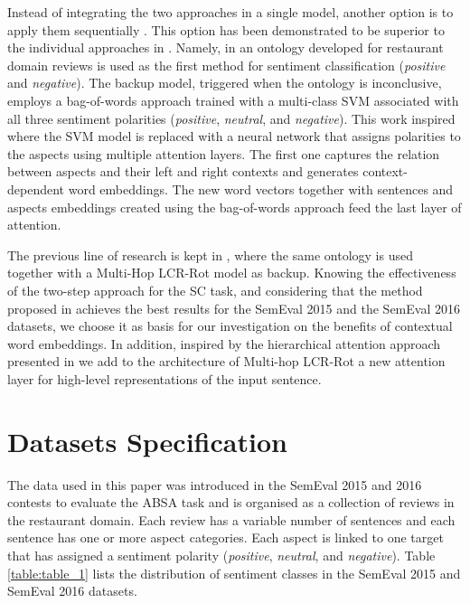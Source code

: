 \documentclass[hidelinks]{llncs}
\begin{document}
Instead of integrating the two approaches in a single model, another option is to apply them sequentially \cite{chikersal2015sentu}. This option has been demonstrated to be superior to the individual approaches in \cite{schouten2018ontology}. Namely, in \cite{schouten2018ontology} an ontology developed for restaurant domain reviews is used as the first method for sentiment classification (\textit{positive} and \textit{negative}). The backup model, triggered when the ontology is inconclusive, employs a bag-of-words approach trained with a multi-class SVM associated with all three sentiment polarities (\textit{positive}, \textit{neutral}, and \textit{negative}). This work inspired \cite{mevskele2019aldona} where the SVM model is replaced with a neural network that assigns polarities to the aspects using multiple attention layers. The first one captures the relation between aspects and their left and right contexts and generates context-dependent word embeddings. The new word vectors together with sentences and aspects embeddings created using the bag-of-words approach feed the last layer of attention. 

The previous line of research is kept in \cite{wallaart2019hybrid}, where the same ontology is used together with a Multi-Hop LCR-Rot model as backup. 
Knowing the effectiveness of the two-step approach for the SC task, and considering that the method proposed in \cite{wallaart2019hybrid} achieves the best results for the SemEval 2015 and the SemEval 2016 \cite{pontiki2016semeval} datasets, we choose it as basis for our investigation on the benefits of contextual word embeddings. In addition, inspired by the hierarchical attention approach presented in \cite{yang2016hierarchical} we add to the architecture of Multi-hop LCR-Rot a new attention layer for high-level representations of the input sentence.




\vspace{-0.1mm}

\section{Datasets Specification}\label{Data_Spec}

The data used in this paper was introduced in the SemEval 2015 and 2016 contests to evaluate the ABSA task and is organised as a collection of reviews in the restaurant domain. Each review has a variable number of sentences and each sentence has one or more aspect categories. Each aspect is linked to one target that has assigned a sentiment polarity (\textit{positive}, \textit{neutral}, and \textit{negative}). Table \ref{table:table_1} lists the distribution of sentiment classes in the SemEval 2015 and SemEval 2016 datasets.
 
\end{document}
